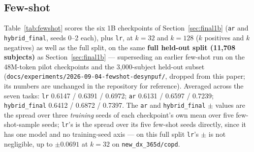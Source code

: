 \documentclass[11pt,a4paper]{article}
\newcommand{\code}[1]{\texttt{\small #1}}
\begin{document}
\subsection{Few-shot}
\label{sec:fewshot}

Table~\ref{tab:fewshot} scores the six 1B checkpoints of
Section~\ref{sec:final1b} (\code{ar} and \code{hybrid\_final}, seeds 0--2
each), plus \code{lr}, at $k = 32$ and $k = 128$ ($k$ positives and $k$
negatives) as well as the full split, on the same \textbf{full held-out
split (11{,}708 subjects)} as Section~\ref{sec:final1b} --- superseding an
earlier few-shot run on the 48M-token pilot checkpoints and the
3{,}000-subject held-out subset
(\code{docs/experiments/2026-09-04-fewshot-desynpuf/}, dropped from this
paper; its numbers are unchanged in the repository for reference).
Averaged across the seven tasks: \code{lr} 0.6147 / 0.6391 / 0.6972;
\code{ar} 0.6131 / 0.6597 / 0.7239; \code{hybrid\_final} 0.6412 / 0.6872 /
0.7397. The \code{ar} and \code{hybrid\_final} $\pm$ values are the spread
over three \emph{training} seeds of each checkpoint's own mean over five
few-shot-sample seeds; \code{lr}'s is the spread over its five few-shot
seeds directly, since it has one model and no training-seed axis --- on this
full split \code{lr}'s $\pm$ is not negligible, up to $\pm0.0691$ at
$k{=}32$ on \code{new\_dx\_365d/copd}.
\end{document}
